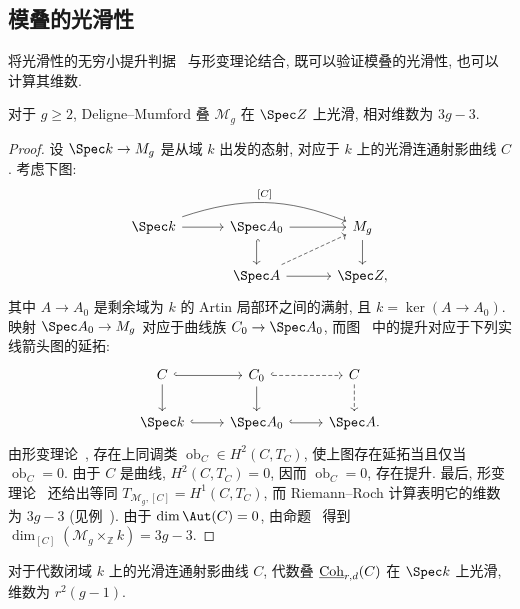 \subsection{模叠的光滑性}\label{src:4.7.2-subsection}
将光滑性的无穷小提升判据~ 与形变理论结合, 既可以验证模叠的光滑性, 也可以计算其维数.
\begin{proposition}\label{src:4.7.7}
对于 $g\geq2$, Deligne--Mumford 叠 $\mathcal M_g$ 在 $\Spec\mathbb Z$ 上光滑, 相对维数为 $3g-3$.
\end{proposition}
\begin{proof}
设 $\Spec k\to\mathcal M_g$ 是从域 $k$ 出发的态射, 对应于 $k$ 上的光滑连通射影曲线 $C$. 考虑下图:
\begin{equation}\label{src:4.7.8}
\begin{tikzcd}[column sep=3em]
\Spec k\arrow[r]\arrow[rr,bend left=20,"{[C]}"]&\Spec A_0\arrow[r]\arrow[d,hook]&\mathcal M_g\arrow[d]\\
{}&\Spec A\arrow[r]\arrow[ur,dashed]&\Spec\mathbb Z,
\end{tikzcd}
\end{equation}
其中 $A\to A_0$ 是剩余域为 $k$ 的 Artin 局部环之间的满射, 且 $k=\ker(A\to A_0)$. 映射 $\Spec A_0\to\mathcal M_g$ 对应于曲线族 $C_0\to\Spec A_0$, 而图~ 中的提升对应于下列实线箭头图的延拓:
\[
\begin{tikzcd}
C\arrow[r,hook]\arrow[d]&C_0\arrow[r,hook,dashed]\arrow[d]&\mathcal C\arrow[d,dashed]\\
\Spec k\arrow[r,hook]&\Spec A_0\arrow[r,hook]&\Spec A.
\end{tikzcd}
\]
由形变理论~, 存在上同调类 $\operatorname{ob}_C\in H^2(C,T_C)$, 使上图存在延拓当且仅当 $\operatorname{ob}_C=0$. 由于 $C$ 是曲线, $H^2(C,T_C)=0$, 因而 $\operatorname{ob}_C=0$, 存在提升. 最后, 形变理论~ 还给出等同 $T_{\mathcal M_g,[C]}=H^1(C,T_C)$, 而 Riemann--Roch 计算表明它的维数为 $3g-3$ (见例~). 由于 $\dim\Aut(C)=0$, 由命题~ 得到 $\dim_{[C]}(\mathcal M_g\times_{\mathbb Z}k)=3g-3$.
\end{proof}
\begin{proposition}\label{src:4.7.9}
对于代数闭域 $k$ 上的光滑连通射影曲线 $C$, 代数叠 $\underline{\mathrm{Coh}}_{r,d}(C)$ 在 $\Spec k$ 上光滑, 维数为 \mbox{$r^2(g-1)$}.
\end{proposition}
